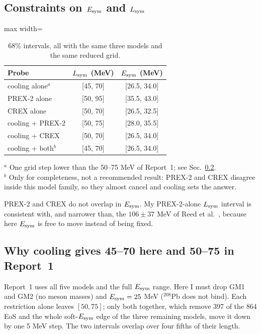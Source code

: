 \documentclass[11pt,a4paper]{article}
\newcommand{\Esym}{E_{\rm sym}}
\newcommand{\Lsym}{L_{\rm sym}}
\begin{document}
\subsection{Constraints on $\Esym$ and $\Lsym$}
\begin{table}[h]
\centering
\caption{68\% intervals, all with the same three models and the same reduced grid.}\label{tab:constraints}
\begin{adjustbox}{max width=\linewidth}
\begin{tabular}{lcc}
\toprule
Probe & $\Lsym$ (MeV) & $\Esym$ (MeV)\\
\midrule
cooling alone$^a$ & [45, 70] & [26.5, 34.0]\\
PREX-2 alone & [50, 95] & [35.5, 43.0]\\
CREX alone & [50, 70] & [26.5, 32.5]\\
cooling + PREX-2 & [50, 75] & [28.0, 35.5]\\
cooling + CREX & [50, 70] & [26.5, 34.0]\\
cooling + both$^b$ & [45, 70] & [26.5, 34.0]\\
\bottomrule
\end{tabular}
\end{adjustbox}

\smallskip
{\footnotesize $^a$ One grid step lower than the 50--75 MeV of Report~1; see Sec.~\ref{sec:reconcile}.\\
$^b$ Only for completeness, not a recommended result: PREX-2 and CREX disagree inside this model family, so they almost cancel and cooling sets the answer.}
\end{table}
PREX-2 and CREX do not overlap in $\Esym$. My PREX-2-alone $\Lsym$ interval is consistent with, and narrower than, the $106\pm37$ MeV of Reed et al.\ \cite{Reed2021}, because here $\Esym$ is free to move instead of being fixed.

\subsection{Why cooling gives 45--70 here and 50--75 in Report~1}\label{sec:reconcile}
Report~1 uses all five models and the full $\Esym$ range. Here I must drop GM1 and GM2 (no meson masses) and $\Esym=25$ MeV ($^{208}$Pb does not bind). Each restriction alone leaves $[50,75]$; only both together, which remove 397 of the 864 EoS and the whole soft-$\Esym$ edge of the three remaining models, move it down by one 5 MeV step. The two intervals overlap over four fifths of their length.
\end{document}
